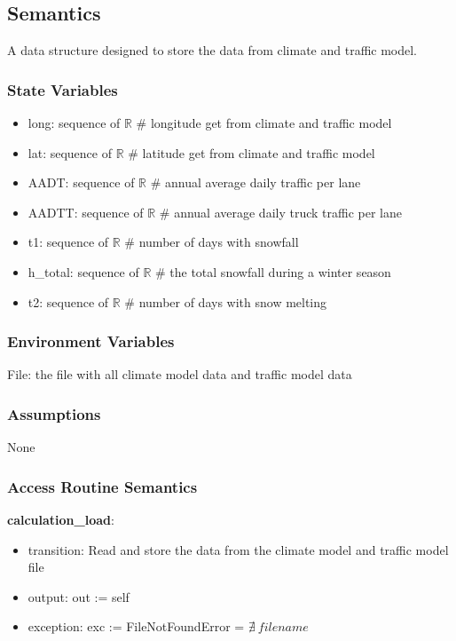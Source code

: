 \documentclass[12pt, titlepage]{article}
\begin{document}
\subsection{Semantics}
A data structure designed to store the data from climate and traffic model.
\subsubsection{State Variables}
\begin{itemize}

\item long: sequence of $\mathbb{R}$ \# longitude get from climate and traffic model
\item lat: sequence of $\mathbb{R}$ \# latitude get from climate and traffic model
\item AADT: sequence of $\mathbb{R}$ \# annual average daily traffic per lane
\item AADTT: sequence of $\mathbb{R}$ \# annual average daily truck traffic per lane
\item t1: sequence of $\mathbb{R}$  \# number of days with snowfall
\item h\_total: sequence of $\mathbb{R}$ \# the total snowfall during a winter season
\item t2: sequence of $\mathbb{R}$  \# number of days with snow melting
\end{itemize}

\subsubsection{Environment Variables}
File: the file with all climate model data and traffic model data
\subsubsection{Assumptions}
None
\subsubsection{Access Routine Semantics}

\noindent \textbf{calculation\_load}:
\begin{itemize}
\item transition: Read and store the data from the climate model and traffic model file
\item output: out := self
\item exception: exc := FileNotFoundError = $\nexists ~ filename$
\end{itemize}
\end{document}
